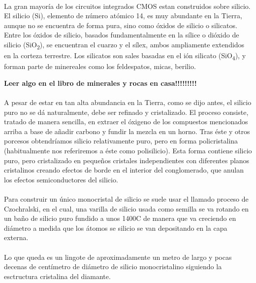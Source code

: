 \paragraph{}
La gran mayoría de los circuitos integrados CMOS estan construidos sobre silicio.
El silicio (Si), elemento de número atómico 14, es muy abundante en la Tierra, aunque
no se encuentra de forma pura, sino como óxidos de silicio o silicatos. Entre los
óxidos de silicio, basados fundamentalmente en la sílice o dióxido de silicio
(SiO\textsubscript{2}), se encuentran el cuarzo y el sílex, ambos ampliamente extendidos
en la corteza terrestre. Los silicatos son sales basadas en el ión silicato (SiO\textsubscript{4}),
y forman parte de minereales como los feldespatos, micas, berilio.

{\huge\textbf{Leer algo en el libro de minerales y rocas en casa!!!!!!!!!}}

\paragraph{}
A pesar de estar en tan alta abundancia en la Tierra, como se dijo antes, el silicio
puro no se dá naturalmente, debe ser refinado y cristalizado. El proceso consiste,
tratado de manera sencilla, en extraer el óxigeno de los compuestos mencionados arriba
a base de añadir carbono y fundir la mezcla en un horno. Tras éste y otros porcesos
obtendríamos silicio relativamente puro, pero en forma policristalina (habitualmente
nos referiremos a éste como polisilicio). Esta forma contiene silicio puro, pero
cristalizado en pequeños cristales independientes con diferentes planos cristalinos
creando efectos de borde en el interior del conglomerado, que anulan los efectos
semiconductores del silicio.

\paragraph{}
Para construir un único monocristal de silicio se suele usar el llamado proceso
de Czochralski, en el cual, una varilla de silicio usada como semilla se va
rotando en un baño de silicio puro fundido a unos 1400\grad C de manera que va creciendo
en diámetro a medida que los átomos se silicio se van depositando en la capa externa.

\paragraph{}
Lo que queda es un lingote de aproximadamente un metro de largo y pocas decenas
de centímetro de diámetro de silicio monocristalino siguiendo la esctructura cristalina del
diamante.

